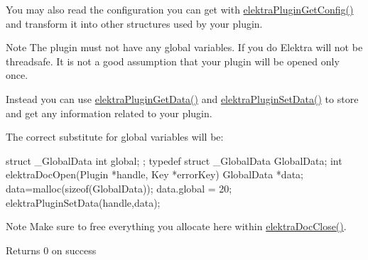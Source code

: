 You may also read the configuration you can get with \hyperlink{group__plugin_ga644bead796506c172817724051c977c9}{elektraPluginGetConfig()} and transform it into other structures used by your plugin.

\begin{DoxyNote}{Note}
The plugin must not have any global variables. If you do Elektra will not be threadsafe. It is not a good assumption that your plugin will be opened only once.
\end{DoxyNote}
Instead you can use \hyperlink{group__plugin_gaafcf3216b46292f222b8cc7828b4dd20}{elektraPluginGetData()} and \hyperlink{group__plugin_gaf4b941a52ff55d0ca2a9158d90208ef2}{elektraPluginSetData()} to store and get any information related to your plugin.

The correct substitute for global variables will be: 
\begin{DoxyCode}
struct _GlobalData{ int global; };
typedef struct _GlobalData GlobalData;
int elektraDocOpen(Plugin *handle, Key *errorKey)
{
        GlobalData *data;
        data=malloc(sizeof(GlobalData));
        data.global = 20;
        elektraPluginSetData(handle,data);
}
\end{DoxyCode}


\begin{DoxyNote}{Note}
Make sure to free everything you allocate here within \hyperlink{group__plugin_gafb66a15abe15f79c9c5b3a928b42147d}{elektraDocClose()}.
\end{DoxyNote}
\begin{DoxyReturn}{Returns}
0 on success 
\end{DoxyReturn}


